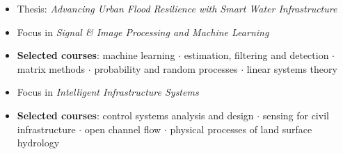 \documentclass[10pt,a4paper,ragged2e]{altacv}
\begin{document}
\vspace{4pt}


\vspace{4pt}




\begin{itemize}
\item Thesis: \textit{Advancing Urban Flood Resilience with Smart Water Infrastructure}
\end{itemize}

\divider

\begin{itemize}
  \item Focus in \textit{Signal \& Image Processing and Machine Learning}
  \item \textbf{Selected courses}: machine learning $\cdot$ estimation, filtering and detection $\cdot$ matrix methods $\cdot$ probability and random processes $\cdot$ linear systems theory 
\end{itemize}

\divider

\begin{itemize}
  \item Focus in \textit{Intelligent Infrastructure Systems}
  \item \textbf{Selected courses}: control systems analysis and design $\cdot$ sensing for civil infrastructure $\cdot$ open channel flow $\cdot$ physical processes of land surface hydrology
\end{itemize}
\end{document}
